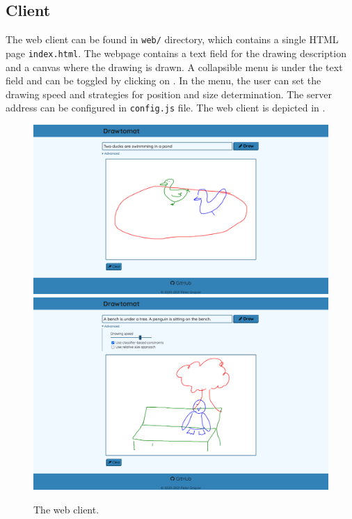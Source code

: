 \subsection{Client}

The web client can be found in \verb|web/| directory, which contains a single HTML page \verb|index.html|. The webpage contains a text field for the drawing description and a canvas where the drawing is drawn. A collapsible menu is under the text field and can be toggled by clicking on . In the menu, the user can set the drawing speed and strategies for position and size determination. The server address can be configured in \verb|config.js| file. The web client is depicted in .

\begin{figure}[ht]
    \centering
    \includegraphics[width=\textwidth]{figures/web_client_1.png}
    \vskip 30pt
    \includegraphics[width=\textwidth]{figures/web_client_2.png}
    \caption[The web client]{The web client.}
    \label{fig:web_client}
\end{figure}
